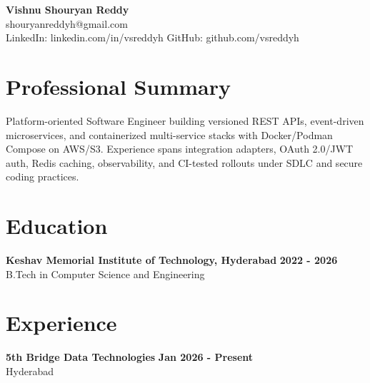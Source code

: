 \documentclass[a4paper,11pt]{article}
\newcommand{\resumeSubheading}[4]{%
  \textbf{#1} \hfill \textbf{#2} \\
{#3} \hfill {#4}
}
\begin{document}
\pagestyle{empty}
\raggedbottom
\addtolength{\textheight}{2\baselineskip}
\small

\begin{center}
  {\LARGE \textbf{Vishnu Shouryan Reddy}}\\[0.3em]
  shouryanreddyh@gmail.com \\[0.3em]
  LinkedIn: linkedin.com/in/vsreddyh \textbar{} GitHub: github.com/vsreddyh
\end{center}
\vspace{-0.8em}

\section*{Professional Summary}

Platform-oriented Software Engineer building versioned REST APIs, event-driven microservices, and containerized multi-service stacks with Docker/Podman Compose on AWS/S3. Experience spans integration adapters, OAuth 2.0/JWT auth, Redis caching, observability, and CI-tested rollouts under SDLC and secure coding practices.

\section*{Education}

\resumeSubheading
{Keshav Memorial Institute of Technology, Hyderabad}{2022 - 2026}
{B.Tech in Computer Science and Engineering}{}


\section*{Experience}

\resumeSubheading
{5th Bridge Data Technologies}{Jan 2026 - Present}
{Hyderabad}{}
\end{document}
